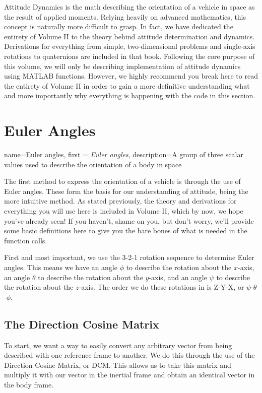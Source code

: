 \documentclass[12pt]{report}
\begin{document}
Attitude Dynamics is the math describing the orientation of a vehicle in space as the result of applied moments. Relying heavily on advanced mathematics, this concept is naturally more difficult to grasp. In fact, we have dedicated the entirety of Volume II to the theory behind attitude determination and dynamics. Derivations for everything from simple, two-dimensional problems and single-axis rotations to \glspl{quaternion} are included in that book. Following the core purpose of this volume, we will only be describing implementation of attitude dynamics using MATLAB functions. However, we highly recommend you break here to read the entirety of Volume II in order to gain a more definitive understanding what and more importantly why everything is happening with the code in this section.


\section{Euler Angles}\label{sec:Euler Angles}
{
    name=Euler angles,
    first = {\textit{Euler angles}},
    description={A group of three scalar values used to describe the orientation of a body in space}
}

The first method to express the orientation of a vehicle is through the use of \gls{Euler angles}. These form the basis for our understanding of attitude, being the more intuitive method. As stated previously, the theory and derivations for everything you will use here is included in Volume II, which by now, we hope you've already seen! If you haven't, shame on you, but don't worry, we'll provide some basic definitions here to give you the bare bones of what is needed in the function calls.

First and most important, we use the 3-2-1 rotation sequence to determine \gls{Euler angles}. This means we have an angle $\phi$ to describe the rotation about the $x$-axis, an angle $\theta$ to describe the rotation about the $y$-axis, and an angle $\psi$ to describe the rotation about the $z$-axis. The order we do these rotations in is Z-Y-X, or $\psi$-$\theta$-$\phi$. 

\subsection{The Direction Cosine Matrix}\label{sec:TheDCM}

To start, we want a way to easily convert any arbitrary vector from being described with one reference frame to another. We do this through the use of the Direction Cosine Matrix, or DCM. This allows us to take this matrix and multiply it with our vector in the \gls{inertial frame} and obtain an identical vector in the \gls{body frame}.
\end{document}
